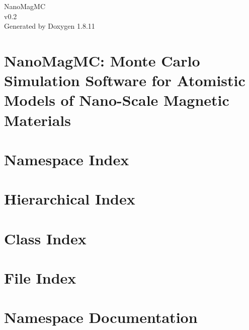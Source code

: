 \documentclass[twoside]{book}
\newcommand{\+}{\discretionary{\mbox{\scriptsize$\hookleftarrow$}}{}{}}
\newcommand{\clearemptydoublepage}{%
  \newpage{\pagestyle{empty}\cleardoublepage}%
}
\begin{document}
\hypersetup{pageanchor=false,
             bookmarksnumbered=true,
             pdfencoding=unicode
            }
\begin{titlepage}
\vspace*{7cm}
\begin{center}%
{\Large Nano\+Mag\+MC \\[1ex]\large v0.\+2 }\\
\vspace*{1cm}
{\large Generated by Doxygen 1.8.11}\\
\end{center}
\end{titlepage}
\clearemptydoublepage
\tableofcontents
\clearemptydoublepage
{}
\hypersetup{pageanchor=true}

\chapter{Nano\+Mag\+MC\+: Monte Carlo Simulation Software for Atomistic Models of Nano-\/\+Scale Magnetic Materials}
\label{index}\hypertarget{index}{}
\chapter{Namespace Index}

\chapter{Hierarchical Index}

\chapter{Class Index}

\chapter{File Index}

\chapter{Namespace Documentation}






\end{document}
